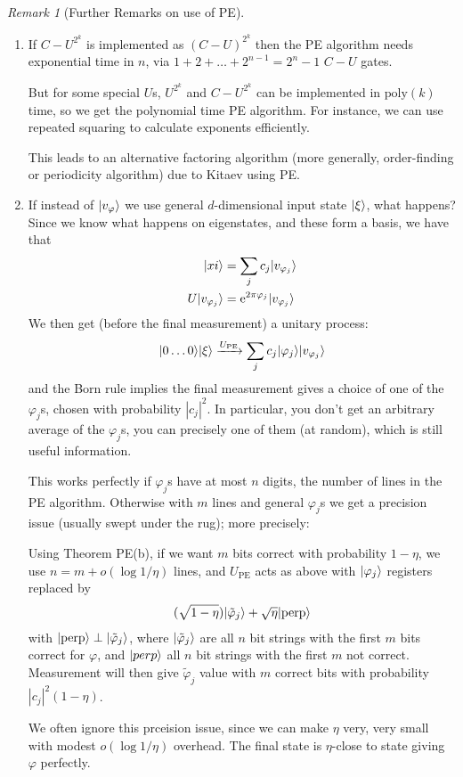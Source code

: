 \documentclass[]{article}
\DeclarePairedDelimiter\ket{\lvert}{\rangle}
\theoremstyle{custhm}
\theoremstyle{cusdef}
\theoremstyle{custhm}
\theoremstyle{custhm}
\theoremstyle{custhm}
\theoremstyle{custhm}
\theoremstyle{cusdef}
\theoremstyle{remark}
\newtheorem*{remark*}{Remark}
\newcommand{\e}{\mathrm{e}}
\renewcommand{\phi}{\varphi}
\newcommand{\poly}{\textrm{poly}}
\begin{document}
\begin{remark*}[Further Remarks on use of PE]\ 
	\begin{enumerate}
		\item If $C-U^{2^k}$ is implemented as $(C-U)^{2^k}$ then the PE algorithm needs exponential time in $n$, via $1 + 2 +\dots + 2^{n-1} = 2^{n}-1$ $C-U$ gates.
		
		But for some special $U$s, $U^{2^k}$ and $C-U^{2^k}$ can be implemented in $\poly(k)$ time, so we get the polynomial time PE algorithm. For instance, we can use repeated squaring to calculate exponents efficiently.

		This leads to an alternative factoring algorithm (more generally, order-finding or periodicity algorithm) due to Kitaev using PE.

		\item If instead of $\ket{v_\phi}$ we use general $d$-dimensional input state $\ket{\xi}$, what happens? Since we know what happens on eigenstates, and these form a basis, we have that
		\begin{align*}
			\ket{xi} &= \sum_{j}c_j\ket{v_{\phi_j}}\\
			U\ket{v_{\phi_j}} &= \e^{2\pi \phi_j}\ket{v_{\phi_j}}
		\end{align*}
		We then get (before the final measurement) a unitary process:
		\begin{align*}
			\ket{0\dots 0}\ket{\xi} \xrightarrow{U_{\textrm{PE}}} \sum_{j}c_j\ket{\phi_j}\ket{v_{\phi_j}}
		\end{align*}
		and the Born rule implies the final measurement gives a choice of one of the $\phi_j$s, chosen with probability $|c_j|^2$. In particular, you don't get an arbitrary average of the $\phi_j$s, you can precisely one of them (at random), which is still useful information.

		This works perfectly if $\phi_j$s have at most $n$ digits, the number of lines in the PE algorithm. Otherwise with $m$ lines and general $\phi_j$s we get a precision issue (usually swept under the rug); more precisely:

		Using Theorem PE(b), if we want $m$ bits correct with probability $1 - \eta$, we use $n = m + o(\log 1/\eta)$ lines, and $U_{\textrm{PE}}$ acts as above with $\ket{\phi_j}$ registers replaced by
		\begin{align*}
			(\sqrt{1-\eta})\ket{\tilde{\phi}_j}+\sqrt{\eta}\ket{\textrm{perp}}
		\end{align*}
		with $\ket{\textrm{perp}}\perp \ket{\tilde{\phi}_j}$, where $\ket{\tilde{\phi}_j}$ are all $n$ bit strings with the first $m$ bits correct for $\phi$, and $\ket{perp}$ all $n$ bit strings with the first $m$ not correct. Measurement will then give $\tilde{\phi}_j$ value with $m$ correct bits with probability $|c_j|^2(1-\eta)$.

		We often ignore this prceision issue, since we can make $\eta$ very, very small with modest $o(\log 1/\eta)$ overhead. The final state is $\eta$-close to state giving $\phi$ perfectly.
	\end{enumerate}

\end{remark*}
\end{document}
